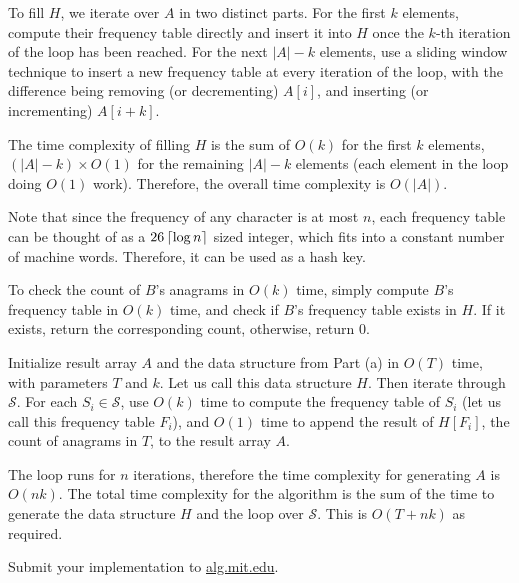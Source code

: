\documentclass[12pt,twoside]{article}
\begin{document}
\begin{problems}
\begin{problemparts}
To fill $H$, we iterate over $A$ in two distinct parts. For the first $k$ elements, compute their frequency table directly and insert it into $H$ once the $k$-th iteration of the loop has been reached. For the next $|A|-k$ elements, use a sliding window technique to insert a new frequency table at every iteration of the loop, with the difference being removing (or decrementing) $A[i]$, and inserting (or incrementing) $A[i+k]$.

The time complexity of filling $H$ is the sum of $O(k)$ for the first $k$ elements, $(|A|-k) \times O(1)$ for the remaining $|A|-k$ elements (each element in the loop doing $O(1)$ work). Therefore, the overall time complexity is $O(|A|)$.

Note that since the frequency of any character is at most $n$, each frequency table can be thought of as a $26\left\lceil \log n \right\rceil$ sized integer, which fits into a constant number of machine words. Therefore, it can be used as a hash key.

To check the count of $B$'s anagrams in $O(k)$ time, simply compute $B$'s frequency table in $O(k)$ time, and check if $B$'s frequency table exists in $H$. If it exists, return the corresponding count, otherwise, return 0.

\problempart %
Initialize result array $A$ and the data structure from Part (a) in $O(T)$ time, with parameters $T$ and $k$. Let us call this data structure $H$. Then iterate through $\mathcal{S}$. For each $S_i \in \mathcal{S}$, use $O(k)$ time to compute the frequency table of $S_i$ (let us call this frequency table $F_i$), and $O(1)$ time to append the result of $H[F_i]$, the count of anagrams in $T$, to the result array $A$.

The loop runs for $n$ iterations, therefore the time complexity for generating $A$ is $O(nk)$. The total time complexity for the algorithm is the sum of the time to generate the data structure $H$ and the loop over $\mathcal{S}$. This is $O(T+nk)$ as required.

\problempart Submit your implementation to {\small\url{alg.mit.edu}}.
\end{problemparts}

\end{problems}
\end{document}
